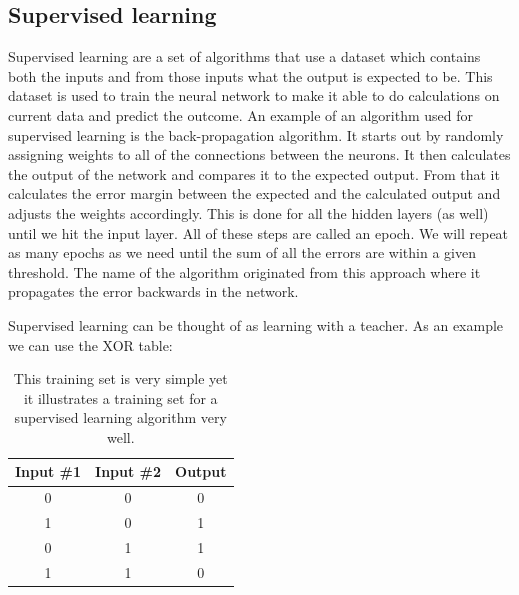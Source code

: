 \subsection{Supervised learning}
Supervised learning are a set of algorithms that use a dataset which contains both the inputs and from those inputs what the output is expected to be. This dataset is used to train the neural network to make it able to do calculations on current data and predict the outcome. An example of an algorithm used for supervised learning is the back-propagation algorithm. 
It starts out by randomly assigning weights to all of the connections between the neurons. It then calculates the output of the network and compares it to the expected output. From that it calculates the error margin between the expected and the calculated output and adjusts the weights accordingly. This is done for all the hidden layers (as well) until we hit the input layer. All of these steps are called an epoch. We will repeat as many epochs as we need until the sum of all the errors are within a given threshold. The name of the algorithm originated from this approach where it propagates the error backwards in the network.

Supervised learning can be thought of as learning with a teacher. As an example we can use the XOR table:

\begin{table}[h!]
\centering  %
\begin{tabular}{c c c} %
Input \#1 & Input \#2 & Output \\ [0.5ex] %
\hline                  %
0 & 0 & 0  \\ %
1 & 0 & 1  \\
0 & 1 & 1  \\
1 & 1 & 0 \\ [1ex] %
\hline %
\end{tabular}
\caption{This training set is very simple yet it illustrates a training set for a supervised learning algorithm very well.} %
\label{table:xor-table} %
\end{table}


